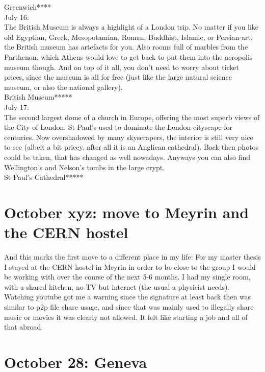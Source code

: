 Greenwich****\\

July 16:\\
The British Museum is always a highlight of a London trip. No matter if you like old Egyptian, Greek, Mesopotamian, Roman, Buddhist, Islamic, or Persian art, the British museum has artefacts for you. Also rooms full of marbles from the Parthenon, which Athens would love to get back to put them into the acropolis museum though. And on top of it all, you don't need to worry about ticket prices, since the museum is all for free (just like the large natural science museum, or also the national gallery).\\

British Museum*****\\

July 17:\\
The second largest dome of a church in Europe, offering the most superb views of the City of London. St Paul's used to dominate the London cityscape for centuries. Now overshadowed by many skyscrapers, the interior is still very nice to see (albeit a bit pricey, after all it is an Anglican cathedral). Back then photos could be taken, that has changed as well nowadays. Anyways you can also find Wellington's and Nelson's tombs in the large crypt.\\

St Paul's Cathedral*****

\section{October xyz: move to Meyrin and the CERN hostel}
\label{moveMeyrin}

And this marks the first move to a different place in my life: For my master thesis I stayed at the CERN hostel in Meyrin in order to be close to the group I would be working with over the course of the next 5-6 months. I had my single room, with a shared kitchen, no TV but internet (the usual a physicist needs). Watching youtube got me a warning since the signature at least back then was similar to p2p file share usage, and since that was mainly used to illegally share music or movies it was clearly not allowed. It felt like starting a job and all of that abroad.

\section{October 28: Geneva}
\label{2006:Geneva}

